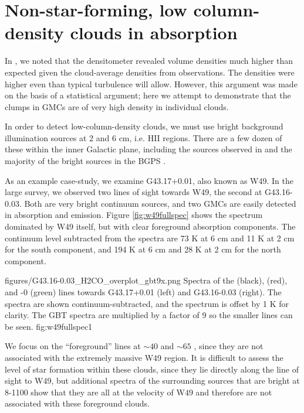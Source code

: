 
\section{Non-star-forming, low column-density clouds in absorption}
In \citet{Ginsburg2011a}, we noted that the \formaldehyde densitometer revealed
volume densities much higher than expected given the cloud-average densities
from \thirteenco observations.  The densities were higher even than typical
turbulence will allow.  However, this argument was made on the basis of a
statistical argument; here we attempt to demonstrate that the clumps in GMCs
are of very high density in individual clouds.

In order to detect low-column-density clouds, we must use bright background
illumination sources at 2 and 6 cm, i.e. HII regions.  There are a few dozen of
these within the inner Galactic plane, including the sources observed in
\citet{Ginsburg2011a} and the majority of the bright sources in the BGPS
\citep{Ginsburg2013}.

As an example case-study, we examine G43.17+0.01, also known as W49.  In the
large survey, we observed two lines of sight towards W49, the second at
G43.16-0.03.  Both are very bright continuum sources, and two GMCs are easily
detected in \formaldehyde absorption and \thirteenco emission.  Figure
\ref{fig:w49fullspec} shows the spectrum dominated by W49 itself, but with
clear foreground absorption components.  The continuum level subtracted from the spectra
are 73 K at 6 cm and 11 K at 2 cm for the south component, and 194 K at 6 cm
and 28 K at 2 cm for the north component.

{figures/G43.16-0.03_H2CO_overplot_gbt9x.png}
{Spectra of the \formaldehyde \oneone (black), \twotwo (red), and -0 (green) lines towards G43.17+0.01 (left) and G43.16-0.03 (right).
The \formaldehyde spectra are shown continuum-subtracted, and the \thirteenco
spectrum is offset by 1 K for clarity.  The GBT \twotwo spectra are multiplied
by a factor of 9 so the smaller lines can be seen.
}{fig:w49fullspec}{1}

We focus on the ``foreground'' lines at $\sim40$ \kms and $\sim65$ \kms, since
they are not associated with the extremely massive W49 region.  It is difficult
to assess the level of star formation within these clouds, since they lie
directly along the line of sight to W49, but additional \formaldehyde spectra
of the surrounding sources that are bright at 8-1100 \um show that they are all
at the velocity of W49 and therefore are not associated with these foreground
clouds.  

